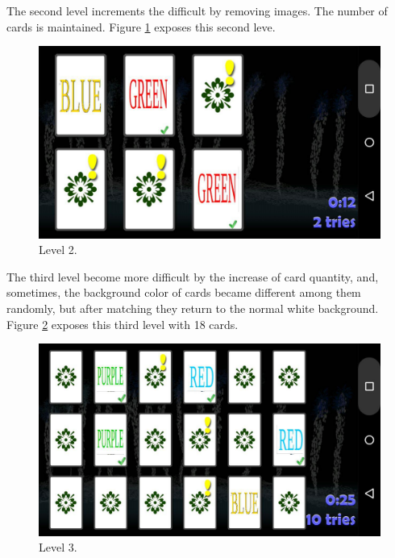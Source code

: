 The second level increments the difficult by removing images. The number of cards is maintained. Figure \ref{lv2} exposes this second leve.

						\begin{figure}[htp]
							\begin{center}
								\includegraphics[scale=0.35]{chapters/desenvolvimento/img/memorystroop.jpg}
								\caption{Level 2.}
								\label{lv2}
							\end{center}
						\end{figure}

The third level become more difficult by the increase of card quantity, and, sometimes, the background color of cards became different among them randomly, but after matching they return to the normal white background. Figure \ref{lv3} exposes this third level with 18 cards.


						\begin{figure}[htp]
							\begin{center}
								\includegraphics[scale=0.35]{chapters/desenvolvimento/img/memorystroop2.jpg}
								\caption{Level 3.}
								\label{lv3}
							\end{center}
						\end{figure}

